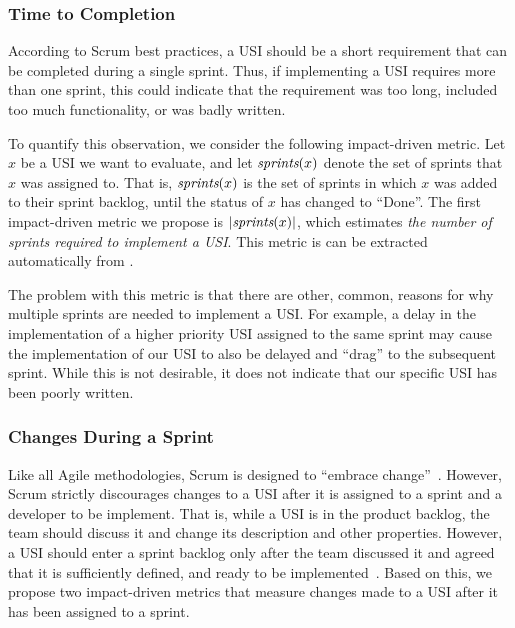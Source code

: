 \subsubsection{Time to Completion}
According to Scrum best practices, a USI should be a short requirement that can be completed during a single sprint. 
Thus, if implementing a USI requires more than one sprint, this could indicate that the requirement was too long, included too much functionality, or was badly written. 

To quantify this observation, we consider the following impact-driven metric. 
Let $x$ be a USI we want to evaluate, and let $\textit{sprints}(x)$ denote the set of sprints that $x$ was assigned to. 
That is, $\textit{sprints}(x)$ is the set of sprints in which $x$ was added to their sprint backlog, until the status of $x$ has changed to ``Done''. 
The first impact-driven metric we propose is $|\textit{sprints}(x)|$, which estimates \emph{the number of sprints required to implement a USI}. 
This metric is can be extracted automatically from \jira. 

The problem with this metric is that there are other, common, reasons for why multiple sprints are needed to implement a USI. 
For example, a delay in the implementation of a higher priority USI assigned to the same sprint may cause the implementation of our USI to also be delayed and ``drag'' to the subsequent sprint. 
While this is not desirable, it does not indicate that our specific USI has been poorly written. 

\subsubsection{Changes During a Sprint}
Like all Agile methodologies, Scrum is designed to ``embrace change''~\cite{fowler2001agile}. 
However, Scrum strictly discourages changes to a USI after it is assigned to a sprint and a developer to be implement. 
That is, while a USI is in the product backlog, the team should discuss it and change its description and other properties. However, a USI should enter a sprint backlog only after the team discussed it and agreed that it is sufficiently defined, and ready to be implemented~\cite{buglione2013improving}. 
Based on this, we propose two impact-driven metrics that measure changes made to a USI after it has been assigned to a sprint. 


